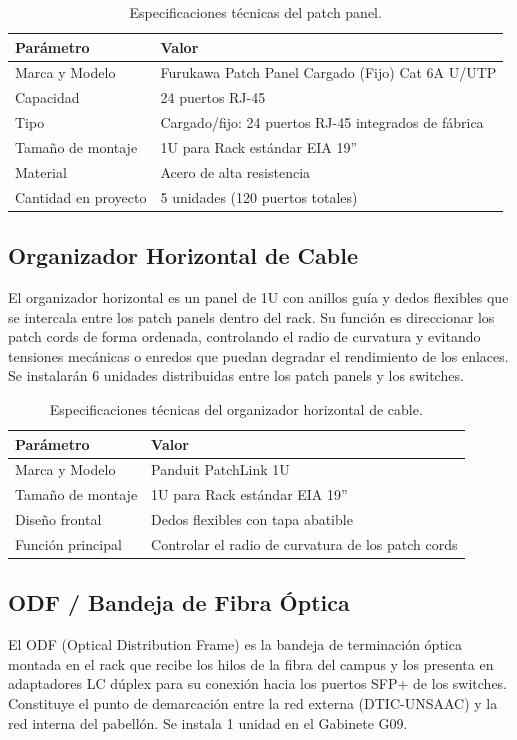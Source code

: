 \begin{table}[H]
\centering
\caption{Especificaciones técnicas del patch panel.}
\label{tab:spec_patchpanel}
\begin{tabular}{lp{9cm}}
\hline
\textbf{Parámetro} & \textbf{Valor} \\
\hline
Marca y Modelo & Furukawa Patch Panel Cargado (Fijo) Cat 6A U/UTP \\
Capacidad & 24 puertos RJ-45 \\
Tipo & Cargado/fijo: 24 puertos RJ-45 integrados de fábrica \\
Tamaño de montaje & 1U para Rack estándar EIA 19'' \\
Material & Acero de alta resistencia \\
Cantidad en proyecto & 5 unidades (120 puertos totales) \\
\hline
\end{tabular}
\end{table}

\subsection{Organizador Horizontal de Cable}
El organizador horizontal es un panel de 1U con anillos guía y dedos flexibles que se intercala entre los patch panels dentro del rack. Su función es direccionar los patch cords de forma ordenada, controlando el radio de curvatura y evitando tensiones mecánicas o enredos que puedan degradar el rendimiento de los enlaces. Se instalarán 6 unidades distribuidas entre los patch panels y los switches.

\begin{table}[H]
\centering
\caption{Especificaciones técnicas del organizador horizontal de cable.}
\label{tab:spec_organizador}
\begin{tabular}{lp{9cm}}
\hline
\textbf{Parámetro} & \textbf{Valor} \\
\hline
Marca y Modelo & Panduit PatchLink 1U \\
Tamaño de montaje & 1U para Rack estándar EIA 19'' \\
Diseño frontal & Dedos flexibles con tapa abatible \\
Función principal & Controlar el radio de curvatura de los patch cords \\
\hline
\end{tabular}
\end{table}

\subsection{ODF / Bandeja de Fibra Óptica}
El ODF (Optical Distribution Frame) es la bandeja de terminación óptica montada en el rack que recibe los hilos de la fibra del campus y los presenta en adaptadores LC dúplex para su conexión hacia los puertos SFP+ de los switches. Constituye el punto de demarcación entre la red externa (DTIC-UNSAAC) y la red interna del pabellón. Se instala 1 unidad en el Gabinete G09.

